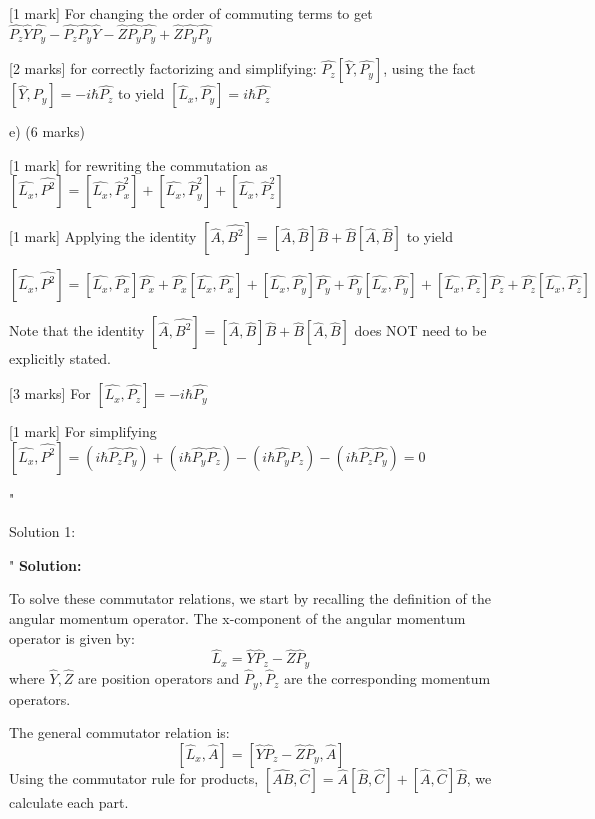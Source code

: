 [1 mark] For changing the order of commuting terms to get \( \hat{P_{z}}\hat{Y}\hat{P_{y}} - \hat{P_{z}}\hat{P_{y}}\hat{Y} - \hat{Z}\hat{P_{y}}\hat{P_{y}} + \hat{Z}\hat{P_{y}}\hat{P_{y}} \)

[2 marks] for correctly factorizing and simplifying: \( \hat{P_{z}}[\hat{Y}, \hat{P_{y}}] \), using the fact \( [\hat{Y}, \hat{P_{y}}] = -i\hbar \hat{P_{z}} \) to yield \( [\hat{L}_x, \hat{P_{y}}] = i\hbar\hat{P_{z}} \)

e) (6 marks)

[1 mark] for rewriting the commutation as \( [\hat{L_{x}}, \hat{P^{2}}] = [\hat{L_{x}}, \hat{P}_{x}^{2} ] + [\hat{L_{x}}, \hat{P}_{y}^{2}] + [\hat{L_{x}}, \hat{P}_{z}^{2}] \)

[1 mark] Applying the identity \( [\hat{A}, \hat{B^{2}}] = [\hat{A}, \hat{B}]\hat{B} + \hat{B}[\hat{A},\hat{B}] \) to yield 

\[ [\hat{L_{x}}, \hat{P^{2}}] = [\hat{L_{x}}, \hat{P_{x}}]\hat{P_{x}} + \hat{P_{x}}[\hat{L_x}, \hat{P_{x}}] + [\hat{L_{x}}, \hat{P_{y}}]\hat{P_{y}} + \hat{P_{y}}[\hat{L_{x}}, \hat{P_{y}}] + [\hat{L_{x}}, \hat{P_{z}}]\hat{P_{z}} + \hat{P_{z}}[\hat{L_{x}}, \hat{P_{z}}] \]

Note that the identity \( [\hat{A}, \hat{B^{2}}] = [\hat{A}, \hat{B}]\hat{B} + \hat{B}[\hat{A},\hat{B}] \) does NOT need to be explicitly stated.

[3 marks] For \( [\hat{L_{x}}, \hat{P_{z}}] = -i\hbar\hat{P_{y}} \)

[1 mark] For simplifying \( [\hat{L_{x}}, \hat{P^{2}}] = (i\hbar\hat{P_{z}}\hat{P_{y}}) + (i\hbar\hat{P_{y}}\hat{P_{z}}) - (i\hbar\hat{P_{y}}\hat{P_{z}}) - (i\hbar\hat{P_{z}}\hat{P_{y}}) = 0 \)

"

Solution 1: 

"
\textbf{Solution:}

To solve these commutator relations, we start by recalling the definition of the angular momentum operator. The x-component of the angular momentum operator is given by:
\[
\hat{L}_x = \hat{Y}\hat{P}_z - \hat{Z}\hat{P}_y
\]
where $\hat{Y}, \hat{Z}$ are position operators and $\hat{P}_y, \hat{P}_z$ are the corresponding momentum operators.

The general commutator relation is:
\[
[\hat{L}_x, \hat{A}] = [\hat{Y}\hat{P}_z - \hat{Z}\hat{P}_y, \hat{A}]
\]
Using the commutator rule for products, $[\hat{AB}, \hat{C}] = \hat{A}[\hat{B}, \hat{C}] + [\hat{A}, \hat{C}]\hat{B}$, we calculate each part.

